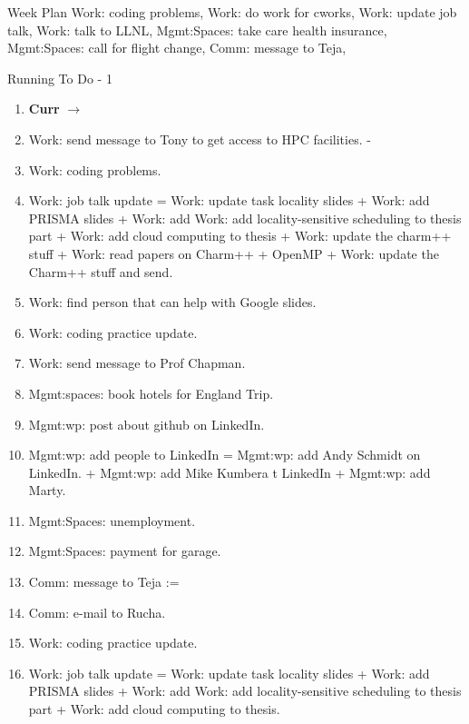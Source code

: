 
\begin{frame}{Week Plan}
Work: coding problems, Work: do work for cworks, Work: update job talk, Work: talk to LLNL, Mgmt:Spaces: take care health insurance, Mgmt:Spaces: call for flight change, Comm: message to Teja,
\end{frame} 
\begin{frame}{Running To Do - 1}
  
  
  
\begin{enumerate}
  \tiny \item[] \tiny \textbf{Curr} $\rightarrow$ 
\item \tiny Work: send message to Tony to get access to HPC facilities. - 
\item \tiny Work: coding problems. 
\item \tiny Work: job talk update = Work: update task locality slides
  + Work: add PRISMA slides + Work: add Work: add locality-sensitive
  scheduling to thesis part + Work: add cloud computing to thesis +
  Work: update the charm++ stuff + Work: read papers on Charm++ +
  OpenMP + Work: update the Charm++ stuff and send.
\item \tiny Work: find person that can help with Google slides. 
 \item \tiny Work: coding practice update.

\item \tiny Work: send message to Prof Chapman.
\item \tiny Mgmt:spaces: book hotels for England Trip.

\item \tiny Mgmt:wp: post about github on LinkedIn. 
\item \tiny Mgmt:wp: add people to LinkedIn =  Mgmt:wp: add Andy
  Schmidt on LinkedIn. +  Mgmt:wp: add Mike Kumbera t  LinkedIn +
  Mgmt:wp: add Marty.
  
\item \tiny Mgmt:Spaces: unemployment.
\item \tiny Mgmt:Spaces: payment for garage.

\item \tiny Comm: message to Teja :=

  
\item \tiny Comm: e-mail to Rucha. 
\item \tiny Work: coding practice update. 
\item \tiny Work: job talk update = Work: update task locality slides
  + Work: add PRISMA slides + Work: add Work: add locality-sensitive 
  scheduling to thesis part + Work: add cloud computing to thesis.
  

\end{enumerate}
\end{frame}
